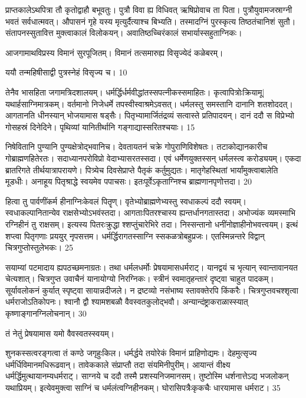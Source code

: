 प्राप्तकालेऽथपित्रा तौ कृतोद्वाहौ बभूवतुः।
पुत्रौ विवा ह्य विधिवत् ऋषिप्रोवाच ता पिता।
पुत्रौयुवामजस्राग्नी भवतं सर्वधात्मवत्।
औपासनं गृहे यस्य मृत्युर्दैत्याश्च बिभ्यति।
तस्मादग्निं पुरस्कृत्य तिष्ठतंचानिशं सुतौ।
संतापनस्सुतावित्त मुक्त्वाकालं विलोकयन्।
अवातिष्ठच्चिरंकालं सभार्यास्सहुताग्निकः।

आजगामाथविप्रस्य विमानं सुरपूजितम्।
विमानं तत्समारुह्य विसृज्येदं कळेबरम्।

ययौ तन्महिषीसाद्वी पुत्रस्नेहं विसृज्य च।
10

तेनैव भासहिता जगामत्रिदशालयम्।
धर्मर्द्धिर्धर्मवीद्धांतस्सपत्नीकस्समाहितः।
कृत्वापित्रोःक्रियामू| यथार्हसाग्निमात्रकम्।
वर्तमानो निजेधर्मे तपस्वीस्वाश्रमेऽवसत्।
धर्मलस्तु समस्तानि दानानि शतशोददत्।
आगतानति धीनस्यान् भोजयामास षड्सैः।
पितृभ्यामार्जितंद्रव्यं सत्वास्ते प्रतिपादयन्।
दानं ददौ स विप्रेभ्यो गोसहस्रं दिनेदिने।
पृथिव्यां यानितीर्थानि गङ्गाद्यास्सरितश्चयाः।
15

निषेवितानि पुण्यानि पुण्यक्षेत्रोद्भवानिच।
देवतायतनं चक्रे गोपुराणिविशेषतः।
तटाकोद्यानकारीच गोब्राह्मणहितेरतः।
सदाध्यानपरोविप्रो वेदाभ्यासरतस्सदा।
एवं धर्मेणयुक्तस्सन् धर्मलस्त्व करोड्ययम्।
एकदा ब्रातरिगते तीर्थयात्रापरायणे।
पित्र्येच दिवसेप्राप्ते पैतृकं कर्तुमुद्यतः।
मातृगेहस्थितां भार्यांमुक्त्वाबालेति मूडधीः।
अनाहूय पितृश्राद्धे स्वयमेव पपाचसः।
इतःपूर्वेऽकृताग्निश्च ब्राह्मणानपृणोत्तदा।
20


हित्वा तु पार्वणींकर्म हीनाग्निःकेवलं पितॄण्।
वृतेभ्योब्राह्मणेभ्यस्तु स्वधाकल्पं ददौ स्वयम्।
स्वधाकल्पानितान्येव राक्षसेभ्योऽभवंस्तदा।
आगताःपितरश्चास्य ह्यन्तर्धानगतास्तदा।
अभोज्यंक व्यमस्माभि रग्निहीनं तु राक्षसम्।
इत्यस्य पितरःक्रुद्धा श्शप्तुंचारेभिरे तदा।
निस्सन्तानो धनींनोज्ञाहीनोभवत्त्वयम्।
इत्थं शप्त्वा पितृगणाः प्रययुर् नृपसत्तम।
धर्मर्द्धिरागतस्साग्नि स्सकळत्रोबहुप्रजः।
एतस्मिन्नन्तरे विद्वान् चित्रगुप्तोस्तुलेभकः।
25

सयाम्यां पटमादाय ह्यपठच्छमनाग्रतः।
तथा धर्मलधर्मोः प्रेषयामासधर्मराट्।
यानद्वयं च भृत्यान् स्वान्तावानयत चेत्यशात्।
चित्रगुप्त उवाचैनं यानायोग्यो निरग्निकः।
स्त्रीनं स्वमातृहन्तारं दृष्ट्वा चाहुत पादकम्।
सूर्यावलोकनं कुर्यात् स्पृष्ट्वा सायान्नदीजले।
न द्रष्टव्यो नसंभाष्य स्तावक्तेरपि किंकरैः।
चित्रगुप्तवचश्शृत्वा धर्मराजोऽतिकोपनः।
श्वानौ द्वौ श्यामशबळौ वैवस्वतकुलोद्भवौ।
अन्यान्दंष्ट्राकराळास्स्यात्
कृष्णाङ्गानग्निलोचनान्।
30

तं नेतुं प्रेषयामास यमो वैवस्वतस्स्वयम्।

शुनकस्सत्वरङ्गत्वा तं कण्ठे जगृहुःकिल।
धर्मर्द्धये तयोरेकं विमानं प्राहिणोद्यमः।
देहमुत्सृज्य धर्मर्धिविमानमधिरूढवान्।
तावेककाले संप्राप्तौ तदा संयमिनीपुरीम्।
आयान्तं वीक्ष्य धर्मर्द्धिमुत्थायानम्यधर्मराट्।
साग्नये च ददौ तस्मै प्रशस्यनिजमानसम्।
तुष्टोस्मि धर्शनात्तेऽद्य भजलोकन् यथाप्रियम्।
इत्येवमुक्त्वा साग्निं च धर्मलंत्वग्निहीनकम्।
घोरासिपत्रैःकृकचैः धारयामास धर्मराट।
35


